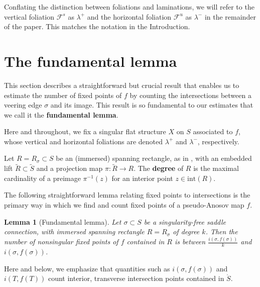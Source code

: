 \documentclass[11pt,letterpaper]{amsart}
\newcommand{\wt}{\widetilde}
\newcommand{\mr}{\mathring}
\newcommand{\fol}[0]{\mathcal{F}}
\numberwithin{equation}{section}
\newtheorem{lemma}[theorem]{Lemma}
\theoremstyle{definition}
\newcommand{\define}[1]{\textbf{#1}}
\newcommand{\from}{\colon} %
\renewcommand{\int}{\mathrm{int}}
\begin{document}
Conflating the distinction between foliations and laminations, we will refer to the vertical foliation $\fol^s$ as $\lambda^+$ and the horizontal foliation $\fol^u$ as $\lambda^-$ in the remainder of the paper. This matches the notation in the Introduction.



\section{The fundamental lemma}\label{Sec:FundamentalLemma}
This section describes a straightforward but crucial result that enables us to estimate the number of fixed points of $f$ by counting the intersections between a veering edge $\sigma$ and its image. This result is so fundamental to our estimates that we call it the \define{fundamental lemma}.

Here and throughout, we fix a singular flat structure $X$ on $S$ associated to $f$, whose vertical and horizontal foliations are denoted $\lambda^+$ and $\lambda^-$, respectively. 

Let $R = R_\sigma \subset S$ be an (immersed) spanning rectangle, as in , with 
an embedded lift $\wt R  \subset \wt S$ and a projection map $\pi \from \wt R \to R$. The \define{degree} of $R$ is the maximal cardinality of a preimage $\pi^{-1}(z)$ for an interior point $z \in \int(R)$.



The following straightforward lemma relating fixed points to intersections is the primary way in which we find and count fixed points of a pseudo-Anosov map $f$. 



\begin{lemma}[Fundamental lemma]\label{Lem:FundamentalLemma}
Let $\sigma \subset S$ be a 
singularity-free saddle connection, 
with immersed spanning rectangle $R = R_\sigma$ of degree $k$. Then the number of nonsingular fixed points of $f$ contained in $R$ is between 
$\frac{i(\sigma, f(\sigma))}{k}$ and $i(\sigma, f(\sigma))$.
\end{lemma}

Here and below, we emphasize that quantities such as $i(\sigma, f(\sigma))$ and $i(T, f(T))$ count interior, transverse intersection points contained in $\mr S$.
\end{document}
